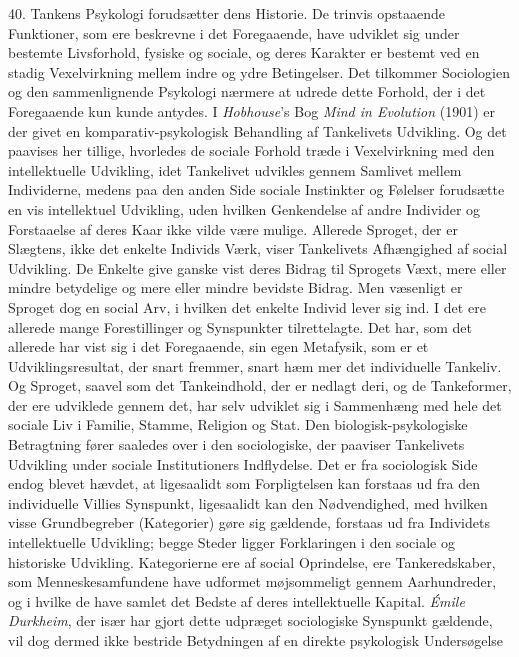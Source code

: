 \documentclass[12pt,a4paper]{book}
\newcommand{\opage}[1]{\marginnote{\footnotesize\textit{[#1]}}}
\begin{document}
40. Tankens Psykologi forudsætter dens Historie. De trinvis opstaaende
Funktioner, som ere beskrevne i det Foregaaende, have udviklet sig under
bestemte Livsforhold, fysiske og sociale, og deres Karakter er bestemt
ved en stadig Vexelvirkning mellem indre og ydre Betingelser. Det
tilkommer Sociologien og den sammenlignende Psykologi nærmere at udrede
dette Forhold, der i det Foregaaende kun kunde antydes. I \emph{Hobhouse}'s Bog \emph{Mind in Evolution} (1901) er der givet en
komparativ-psykologisk Behandling af Tankelivets Udvikling. Og det
paavises her tillige, hvorledes de sociale Forhold træde i Vexelvirkning
med den intellektuelle Udvikling, idet Tankelivet udvikles gennem
Samlivet mellem Individerne, medens paa den anden Side sociale Instinkter
og Følelser forudsætte en vis intellektuel Udvikling, uden hvilken
Genkendelse af andre Individer og Forstaaelse af deres Kaar ikke vilde
være mulige. Allerede Sproget, der er Slægtens, ikke det enkelte Individs
Værk, viser Tankelivets Afhængighed af social Udvikling. De Enkelte give
ganske vist deres Bidrag til Sprogets Væxt, mere eller mindre betydelige
og mere eller mindre bevidste Bidrag. Men væsenligt er Sproget dog en social Arv, i hvilken det enkelte Individ lever sig ind. I det ere
allerede mange Forestillinger og Synspunkter tilrettelagte. Det har, som
det allerede har vist sig i det Foregaaende, sin egen Metafysik, som er
et Udviklingsresultat, der snart fremmer, snart hæm%
\opage{110}mer det individuelle
Tankeliv. Og Sproget, saavel som det Tankeindhold, der er nedlagt deri,
og de Tankeformer, der ere udviklede gennem det, har selv udviklet sig i
Sammenhæng med hele det sociale Liv i Familie, Stamme, Religion og Stat.
Den biologisk-psykologiske Betragtning fører saaledes over i den
sociologiske, der paaviser Tankelivets Udvikling under sociale
Institutioners Indflydelse. Det er fra sociologisk Side endog blevet
hævdet, at ligesaalidt som Forpligtelsen kan forstaas ud fra den
individuelle Villies Synspunkt, ligesaalidt kan den Nødvendighed, med
hvilken visse Grundbegreber (Kategorier) gøre sig gældende, forstaas ud
fra Individets intellektuelle Udvikling; begge Steder ligger
Forklaringen i den sociale og historiske Udvikling. Kategorierne ere af
social Oprindelse, ere Tankeredskaber, som Menneskesamfundene have
udformet møjsommeligt gennem Aarhundreder, og i hvilke de have samlet
det Bedste af deres intellektuelle Kapital. \emph{Émile Durkheim}, der
især har gjort dette udpræget sociologiske Synspunkt gældende, vil dog
dermed ikke bestride Betydningen af en direkte psykologisk Undersøgelse
\end{document}
